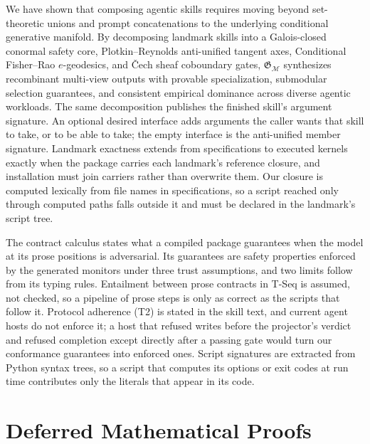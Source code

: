 \documentclass[11pt]{article}
\theoremstyle{definition}
\theoremstyle{plain}
\newcommand{\Mcal}{\mathcal{M}}
\newcommand{\Gfrak}{\mathfrak{G}}
\begin{document}
We have shown that composing agentic skills requires moving beyond set-theoretic unions and prompt concatenations to the underlying conditional generative manifold. By decomposing landmark skills into a Galois-closed conormal safety core, Plotkin--Reynolds anti-unified tangent axes, Conditional Fisher--Rao $e$-geodesics, and \v{C}ech sheaf coboundary gates, $\Gfrak_{\Mcal}$ synthesizes recombinant multi-view outputs with provable specialization, submodular selection guarantees, and consistent empirical dominance across diverse agentic workloads. The same decomposition publishes the finished skill's argument signature. An optional desired interface adds arguments the caller wants that skill to take, or to be able to take; the empty interface is the anti-unified member signature. Landmark exactness extends from specifications to executed kernels exactly when the package carries each landmark's reference closure, and installation must join carriers rather than overwrite them. Our closure is computed lexically from file names in specifications, so a script reached only through computed paths falls outside it and must be declared in the landmark's script tree.

The contract calculus states what a compiled package guarantees when the model at its prose positions is adversarial. Its guarantees are safety properties enforced by the generated monitors under three trust assumptions, and two limits follow from its typing rules. Entailment between prose contracts in T-Seq is assumed, not checked, so a pipeline of prose steps is only as correct as the scripts that follow it. Protocol adherence (T2) is stated in the skill text, and current agent hosts do not enforce it; a host that refused writes before the projector's verdict and refused completion except directly after a passing gate would turn our conformance guarantees into enforced ones. Script signatures are extracted from Python syntax trees, so a script that computes its options or exit codes at run time contributes only the literals that appear in its code.




\clearpage
\appendix
\section{Deferred Mathematical Proofs}
\label{app:proofs}
\end{document}

